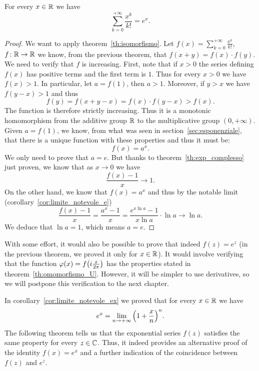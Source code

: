 \begin{theorem}%
\label{th:exp=ex}%
\label{th:serie_esponenziale}%
%
\mymark{***}%
For every $x\in {\mathbb R}$ we have
\[
  \sum_{k=0}^{+\infty} \frac{x^k}{k!} = e^x.
\]
\end{theorem}
%
\begin{proof}\mymark{**}
We want to apply theorem~\ref{th:isomorfismo}.
Let $f(x)=\sum_{k=0}^{+\infty} \frac{x^k}{k!}$, 
$f\colon {\mathbb R}\to{\mathbb R}$ we know,
from the previous theorem, that $f(x+y)=f(x)\cdot f(y)$.
We need to verify that $f$ is increasing.
First, note that if $x> 0$ the series defining
$f(x)$ has positive terms and the first term is $1$.
Thus for every $x> 0$ we have $f(x)>1$.
In particular, let $a=f(1)$, then $a>1$.
Moreover, if $y>x$ we have $f(y-x)>1$ and thus
\[
 f(y) = f(x+y-x) = f(x)\cdot f(y-x) > f(x).
\]
The function is therefore strictly increasing. 
Thus it is a monotonic homomorphism from the additive group ${\mathbb R}$ to 
the multiplicative group $(0,+\infty)$.
Given $a=f(1)$, we know,
from what was seen in section~\ref{sec:esponenziale},
that there is a unique function with these properties and thus 
it must be: 
\[
  f(x)= a^x.
\]
We only need to prove that $a=e$.
But thanks to theorem~\ref{th:exp_complesso}
just proven, we know that as $x\to 0$ we have
\[
  \frac{f(x)-1}{x}\to 1.
\]
On the other hand, we know that $f(x)=a^x$ and thus
by the notable limit (corollary~\ref{cor:limite_notevole_e})
\[
\frac{f(x)-1}{x} = \frac{a^{x}-1}{x}
= \frac{e^{x \ln a}-1}{x \ln a} \cdot \ln a
\to \ln a.
\]
We deduce that $\ln a= 1$, which means $a=e$.
\end{proof}

With some effort, it would also be possible to prove that 
indeed $f(z)=e^z$ (in the previous theorem, we proved it 
only for $x\in {\mathbb R}$). 
It would involve verifying that the function 
$\varphi(x) = f{\left( i\frac{x}{2\pi} \right)}$
has the properties stated in theorem~\ref{th:omomorfismo_U}.
However, it will be simpler to use derivatives, so we will postpone this 
verification to the next chapter.

In corollary~\ref{cor:limite_notevole_ex}
we proved that 
for every $x\in {\mathbb R}$ we have
\[
  e^x = \lim_{n\to +\infty} {\left( 1+\frac x n \right)}^n.  
\]
The following theorem tells us that the exponential series $f(z)$ 
satisfies the same property for every $z \in {\mathbb C}$.
Thus, it indeed provides an alternative proof 
of the identity $f(x) = e^x$ and a further indication 
of the coincidence between $f(z)$ and $e^z$.

